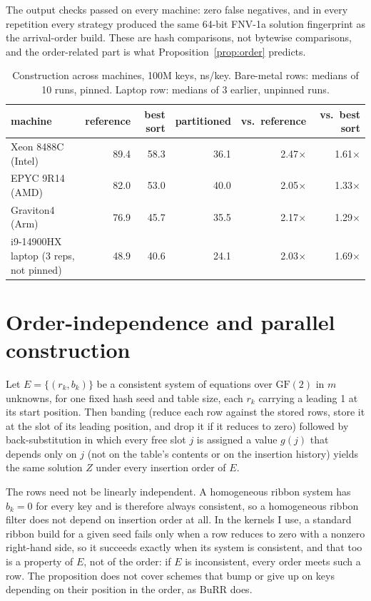 \documentclass[a4paper,UKenglish,cleveref,autoref,thm-restate,anonymous]{lipics-v2021}
\begin{document}
The output checks passed on every machine: zero false negatives, and in every repetition every
strategy produced the same 64-bit FNV-1a solution fingerprint as the arrival-order build. These
are hash comparisons, not bytewise comparisons, and the order-related part is what
Proposition~\ref{prop:order} predicts.

\begin{table}
\caption{Construction across machines, 100M keys, ns/key. Bare-metal rows: medians of 10 runs,
pinned. Laptop row: medians of 3 earlier, unpinned runs.}
\label{tab:arm}
\small\setlength{\tabcolsep}{4pt}
\begin{tabular}{lrrrrr}
\toprule
machine & reference & best sort & partitioned & vs.\ reference & vs.\ best sort \\
\midrule
Xeon 8488C (Intel) & 89.4 & 58.3 & 36.1 & 2.47$\times$ & 1.61$\times$ \\
EPYC 9R14 (AMD) & 82.0 & 53.0 & 40.0 & 2.05$\times$ & 1.33$\times$ \\
Graviton4 (Arm) & 76.9 & 45.7 & 35.5 & 2.17$\times$ & 1.29$\times$ \\
i9-14900HX laptop (3 reps, not pinned) & 48.9 & 40.6 & 24.1 & 2.03$\times$ & 1.69$\times$ \\
\bottomrule
\end{tabular}
\end{table}

\section{Order-independence and parallel construction}\label{sec:parallel}
\begin{proposition}\label{prop:order}
Let $E=\{(r_k,b_k)\}$ be a consistent system of equations over $\mathrm{GF}(2)$ in $m$ unknowns,
for one fixed hash seed and table size, each $r_k$ carrying a leading 1 at its start position. Then banding (reduce each row against the stored
rows, store it at the slot of its leading position, and drop it if it reduces to zero) followed
by back-substitution in which every free slot $j$ is assigned a value $g(j)$ that depends only
on $j$ (not on the table's contents or on the insertion history) yields the same solution $Z$
under every insertion order of $E$.
\end{proposition}
The rows need not be linearly independent. A homogeneous ribbon system has $b_k=0$ for every key
and is therefore always consistent, so a homogeneous ribbon filter does not depend on insertion
order at all. In the kernels I use, a standard ribbon build for a given seed fails only when a
row reduces to zero with a nonzero right-hand side, so it succeeds exactly when its system is
consistent, and that too is a property of $E$, not of the order: if $E$ is inconsistent, every
order meets such a row. The proposition does not cover schemes that bump or give up on keys
depending on their position in the order, as BuRR does.
\end{document}
